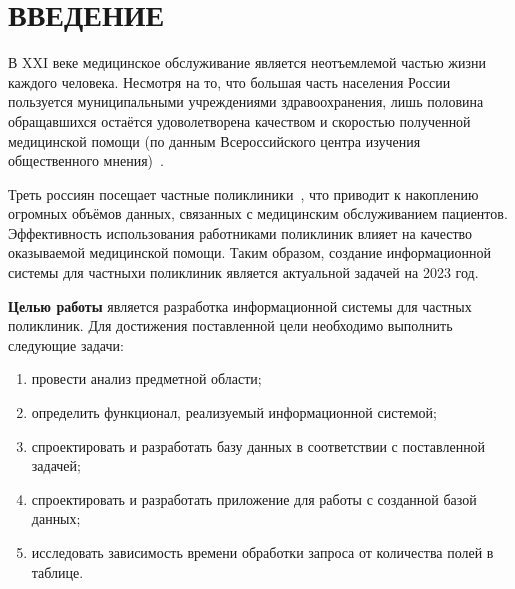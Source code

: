 \section*{\large ВВЕДЕНИЕ}

В XXI веке медицинское обслуживание является неотъемлемой частью жизни каждого человека. Несмотря на то, что большая часть населения России пользуется муниципальными учреждениями здравоохранения, лишь половина обращавшихся остаётся удоволетворена качеством и скоростью полученной медицинской помощи (по данным Всероссийского центра изучения общественного мнения)~\cite{wciom}.

Треть россиян посещает частные поликлиники~\cite{wciom}, что приводит к накоплению огромных объёмов данных, связанных с медицинским обслуживанием пациентов. 
Эффективность использования работниками поликлиник влияет на качество оказываемой медицинской помощи. 
Таким образом, создание информационной системы для частныхи поликлиник является актуальной задачей на 2023 год.


\textbf{Целью работы} является разработка информационной системы для частных поликлиник.
Для достижения поставленной цели необходимо выполнить следующие задачи:
\begin{enumerate}[label=\arabic*)]
	\item провести анализ предметной области;
	\item определить функционал, реализуемый информационной системой;
	\item спроектировать и разработать базу данных в соответствии с поставленной задачей;
	\item спроектировать и разработать приложение для работы с созданной базой данных;
	\item исследовать зависимость времени обработки запроса от количества полей в таблице.
\end{enumerate}

